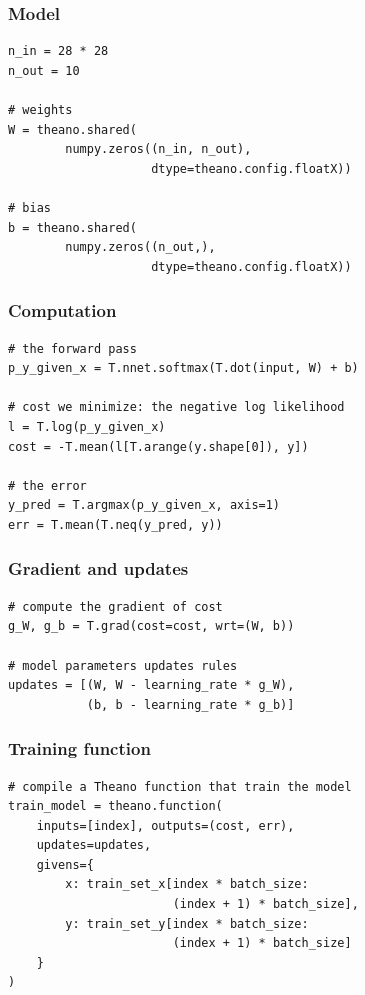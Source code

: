 \documentclass[utf8x,xcolor=pdftex,dvipsnames,table]{beamer}
\begin{document}
\begin{frame}[fragile]
  \frametitle{Model}
\begin{lstlisting}
n_in = 28 * 28
n_out = 10

# weights
W = theano.shared(
        numpy.zeros((n_in, n_out),
                    dtype=theano.config.floatX))

# bias
b = theano.shared(
        numpy.zeros((n_out,),
                    dtype=theano.config.floatX))
\end{lstlisting}
\end{frame}


\begin{frame}[fragile]
  \frametitle{Computation}
\begin{lstlisting}
# the forward pass
p_y_given_x = T.nnet.softmax(T.dot(input, W) + b)

# cost we minimize: the negative log likelihood
l = T.log(p_y_given_x)
cost = -T.mean(l[T.arange(y.shape[0]), y])

# the error
y_pred = T.argmax(p_y_given_x, axis=1)
err = T.mean(T.neq(y_pred, y))
\end{lstlisting}
\end{frame}


\begin{frame}[fragile]
  \frametitle{Gradient and updates}
\begin{lstlisting}
# compute the gradient of cost
g_W, g_b = T.grad(cost=cost, wrt=(W, b))

# model parameters updates rules
updates = [(W, W - learning_rate * g_W),
           (b, b - learning_rate * g_b)]
\end{lstlisting}
\end{frame}


\begin{frame}[fragile]
  \frametitle{Training function}
\begin{lstlisting}
# compile a Theano function that train the model
train_model = theano.function(
    inputs=[index], outputs=(cost, err),
    updates=updates,
    givens={
        x: train_set_x[index * batch_size:
                       (index + 1) * batch_size],
        y: train_set_y[index * batch_size:
                       (index + 1) * batch_size]
    }
)
\end{lstlisting}
\end{frame}
\end{document}

